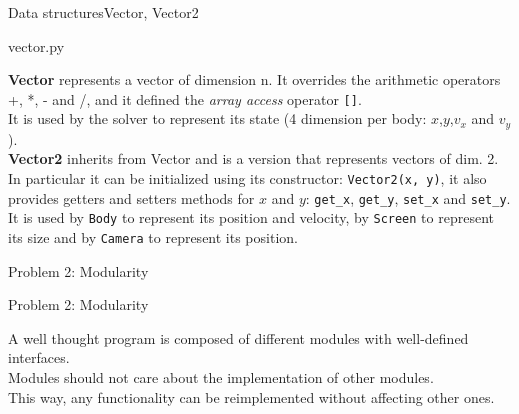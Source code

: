 \documentclass[colorlinks]{beamer}
\begin{document}
\begin{frame}{Data structures}{Vector, Vector2}
    \small

    {\centering vector.py \par}

    \vspace{1em}

    \textbf{Vector} represents a vector of dimension n. It overrides the arithmetic operators +, *, - and /, and it defined the \emph{array access} operator \texttt{[]}.\\
    
    It is used by the solver to represent its state (4 dimension per body: $x$,$y$,$v_x$ and $v_y$).\\

    \textbf{Vector2} inherits from Vector and is a version that represents vectors of dim. 2. In particular it can be initialized using its constructor: \texttt{Vector2(x, y)}, it also provides getters and setters methods for $x$ and $y$: \texttt{get_x}, \texttt{get_y}, \texttt{set_x} and \texttt{set_y}.\\

    It is used by \texttt{Body} to represent its position and velocity, by \texttt{Screen} to represent its size and by \texttt{Camera} to represent its position.
\end{frame}

\begin{frame}\centering\huge Problem 2: Modularity\end{frame}

\begin{frame}[fragile]{Problem 2: Modularity}
    
    A well thought program is composed of different modules with well-defined interfaces.\\

    Modules should not care about the implementation of other modules.\\

    This way, any functionality can be reimplemented without affecting other ones.
    
\end{frame}
\end{document}
